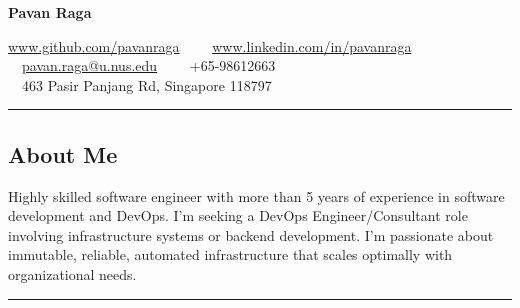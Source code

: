 \documentclass[11pt,a4paper]{article}
\begin{document}
\begin{center}
{\huge \textbf{Pavan Raga}}


\href{https://github.com/pavanraga}{www.github.com/pavanraga}\ \ \textbullet
\ \ \href{https://www.linkedin.com/in/pavanraga/}{www.linkedin.com/in/pavanraga}\ \ \textbullet
\ \ \href{mailto:pavan.raga98@gmail.com}{pavan.raga@u.nus.edu}\ \ \textbullet
\ \ {+65-98612663} \\
\ \ {463 Pasir Panjang Rd, Singapore 118797}

\end{center}

\hrule
\vspace{-1.0em}
\subsection*{About Me}
\noindent Highly skilled software engineer with more than 5 years of experience in software development and DevOps. I’m seeking a DevOps Engineer/Consultant role involving infrastructure systems or backend development. I’m passionate about immutable, reliable, automated infrastructure that scales optimally with organizational needs.
\\

\hrule
\vspace{-1.0em}
\end{document}
